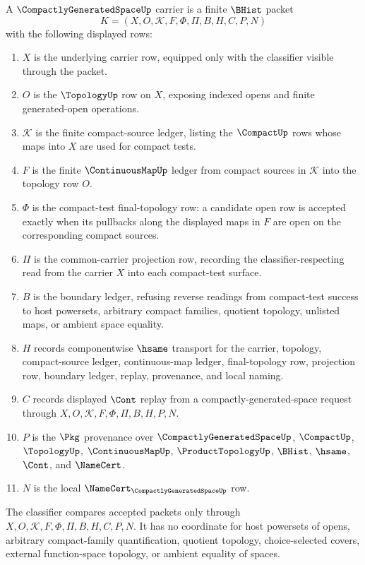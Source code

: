 \begin{definition}\label{def:compactly-generated-space-carrier}
A $\CompactlyGeneratedSpaceUp$ carrier is a finite $\BHist$ packet
$$
K=(X,O,\mathcal K,F,\Phi,\Pi,B,H,C,P,N)
$$
with the following displayed rows:
\begin{enumerate}
\item $X$ is the underlying carrier row, equipped only with the classifier visible through the packet.
\item $O$ is the $\TopologyUp$ row on $X$, exposing indexed opens and finite generated-open operations.
\item $\mathcal K$ is the finite compact-source ledger, listing the $\CompactUp$ rows whose maps into $X$ are used for compact tests.
\item $F$ is the finite $\ContinuousMapUp$ ledger from compact sources in $\mathcal K$ into the topology row $O$.
\item $\Phi$ is the compact-test final-topology row: a candidate open row is accepted exactly when its pullbacks along the displayed maps in $F$ are open on the corresponding compact sources.
\item $\Pi$ is the common-carrier projection row, recording the classifier-respecting read from the carrier $X$ into each compact-test surface.
\item $B$ is the boundary ledger, refusing reverse readings from compact-test success to host powersets, arbitrary compact families, quotient topology, unlisted maps, or ambient space equality.
\item $H$ records componentwise $\hsame$ transport for the carrier, topology, compact-source ledger, continuous-map ledger, final-topology row, projection row, boundary ledger, replay, provenance, and local naming.
\item $C$ records displayed $\Cont$ replay from a compactly-generated-space request through $X,O,\mathcal K,F,\Phi,\Pi,B,H,P,N$.
\item $P$ is the $\Pkg$ provenance over $\CompactlyGeneratedSpaceUp$, $\CompactUp$, $\TopologyUp$, $\ContinuousMapUp$, $\ProductTopologyUp$, $\BHist$, $\hsame$, $\Cont$, and $\NameCert$.
\item $N$ is the local $\NameCert_{\CompactlyGeneratedSpaceUp}$ row.
\end{enumerate}
The classifier compares accepted packets only through $X,O,\mathcal K,F,\Phi,\Pi,B,H,C,P,N$. It has no coordinate for host powersets of opens, arbitrary compact-family quantification, quotient topology, choice-selected covers, external function-space topology, or ambient equality of spaces.
\end{definition}

